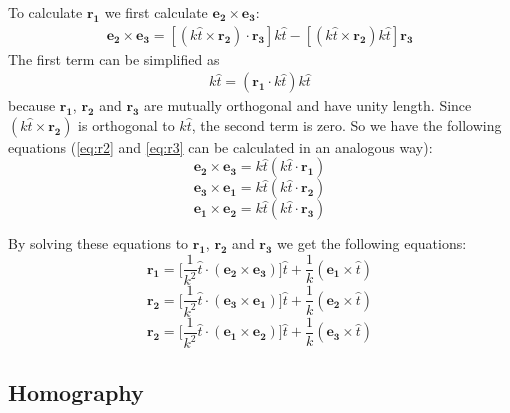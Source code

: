 To calculate $\boldsymbol{r_1}$ we first calculate $\boldsymbol{e_2 \times e_3}$:
\begin{align*}
    \boldsymbol{e_2} \times \boldsymbol{e_3} = [(k\hat{t}\times \boldsymbol{r_2})\cdot\boldsymbol{r_3}]k\hat{t} - [(k \hat{t} \times \boldsymbol{r_2})k \hat{t}]\boldsymbol{r_3}
\end{align*}
The first term can be simplified as 
\begin{align}
    [(\boldsymbol{r_2}\times\boldsymbol{r_3})\cdot k\hat{t}]k\hat{t} = (\boldsymbol{r_1}\cdot k\hat{t})k\hat{t}
\end{align}
because $\boldsymbol{r_1}$, $\boldsymbol{r_2}$ and $\boldsymbol{r_3}$ are mutually orthogonal and have unity length. Since $(k\hat{t}\times\boldsymbol{r_2})$ is orthogonal to $k\hat{t}$, the second term is zero. So we have the following equations (\autoref{eq:r2} and \autoref{eq:r3} can be calculated in an analogous way):
\begin{equation}
    \boldsymbol{e_2} \times \boldsymbol{e_3} = k\hat{t}(k\hat{t}\cdot\boldsymbol{r_1})
\end{equation}
\begin{equation}\label{eq:r2}
    \boldsymbol{e_3} \times \boldsymbol{e_1} = k\hat{t}(k\hat{t}\cdot\boldsymbol{r_2})
\end{equation}
\begin{equation}\label{eq:r3}
    \boldsymbol{e_1} \times \boldsymbol{e_2} = k\hat{t}(k\hat{t}\cdot\boldsymbol{r_3})
\end{equation}

By solving these equations to $\boldsymbol{r_1}$, $\boldsymbol{r_2}$ and $\boldsymbol{r_3}$ we get the following equations:
\begin{equation}
    \boldsymbol{r_1} = \biggl[\frac{1}{k^2}\hat{t}\cdot(\boldsymbol{e_2}\times\boldsymbol{e_3})\biggr]\hat{t}+\frac{1}{k}(\boldsymbol{e_1}\times\hat{t})
\end{equation}
\begin{equation}
    \boldsymbol{r_2} = \biggl[\frac{1}{k^2}\hat{t}\cdot(\boldsymbol{e_3}\times\boldsymbol{e_1})\biggr]\hat{t}+\frac{1}{k}(\boldsymbol{e_2}\times\hat{t})
\end{equation}
\begin{equation}
    \boldsymbol{r_2} = \biggl[\frac{1}{k^2}\hat{t}\cdot(\boldsymbol{e_1}\times\boldsymbol{e_2})\biggr]\hat{t}+\frac{1}{k}(\boldsymbol{e_3}\times\hat{t})
\end{equation}\bigskip

\subsection{Homography}

